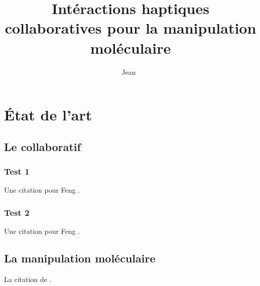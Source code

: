 \documentclass[english]{mythesis}
\title{Intéractions haptiques collaboratives pour la manipulation moléculaire}
\author{Jean~\name{Simard}}
\date{\mydate[datestyle=long]{01}{12}{2011}}
\begin{document}
	\frontmatter
	\maketitle
	\mytoc
	\mylof
	\mylot
	\mainmatter
	\chapter{État de l'art}
	\myminitoc
	\section{Le collaboratif}
	\subsection{Test 1}
	Une citation pour Feng .

	\subsection{Test 2}
	Une citation pour Feng .
	\myminibiblio

	\section{La manipulation moléculaire}
	La citation de .
	\begin{myfigure}
		\begin{mysubfigure}[0.25\textwidth]
		\end{mysubfigure}
		\begin{mysubfigure}[0.25\textwidth]
		\end{mysubfigure}
		\begin{mysubfigure}[0.25\textwidth]
		\end{mysubfigure}
	\end{myfigure}
	\myminibiblio
\end{document}
